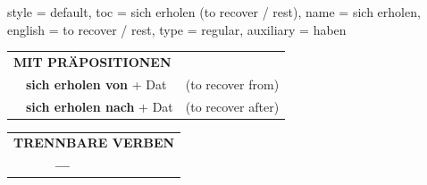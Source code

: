 \begin{verbentry}{
  style = {default},
  toc = {sich erholen (to recover / rest)},
  name = {sich erholen},
  english = {to recover / rest},
  type = {regular},
  auxiliary = {haben}
}
\vspace{10pt}

\begin{tabular}{lll}
\multicolumn{3}{l}{\textbf{MIT PRÄPOSITIONEN}}\\
& \textbf{sich erholen von} + Dat & (to recover from)\\
& \textbf{sich erholen nach} + Dat & (to recover after)\\
\end{tabular}
\hfill
\begin{tabular}{lll}
\multicolumn{3}{l}{\textbf{TRENNBARE VERBEN}}\\
& \textbf{---} & \\
\end{tabular}

\vspace{-5pt}
\end{verbentry}

